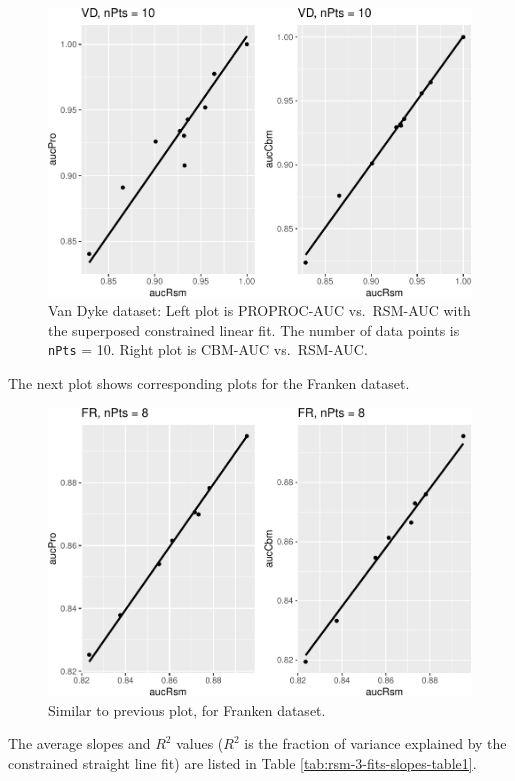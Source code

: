\documentclass[
]{book}
\begin{document}
\begin{figure}
\centering
\includegraphics{19b-rsm-3-fits_files/figure-latex/rsm-3-fits-plots-2-1.pdf}
\caption{\label{fig:rsm-3-fits-plots-2}Van Dyke dataset: Left plot is PROPROC-AUC vs.~RSM-AUC with the superposed constrained linear fit. The number of data points is \texttt{nPts} = 10. Right plot is CBM-AUC vs.~RSM-AUC.}
\end{figure}

The next plot shows corresponding plots for the Franken dataset.

\begin{figure}
\centering
\includegraphics{19b-rsm-3-fits_files/figure-latex/rsm-3-fits-plots-3-1.pdf}
\caption{\label{fig:rsm-3-fits-plots-3}Similar to previous plot, for Franken dataset.}
\end{figure}

The average slopes and \(R^2\) values (\(R^2\) is the fraction of variance explained by the constrained straight line fit) are listed in Table \ref{tab:rsm-3-fits-slopes-table1}.
\end{document}
